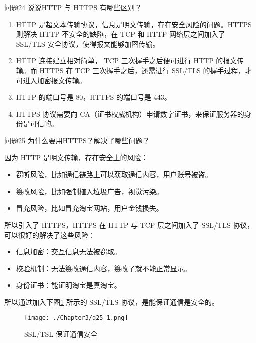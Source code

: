 \documentclass[cn,11pt,color=blue,lang=cn]{elegantbook}
\begin{document}
\begin{custom}{问题24}
说说HTTP 与 HTTPS 有哪些区别？
\end{custom}
\begin{solution}
\begin{enumerate}
	\item HTTP 是超⽂本传输协议，信息是明⽂传输，存在安全⻛险的问题。HTTPS 则解决 HTTP 不安全的缺陷，在 TCP 和 HTTP ⽹络层之间加⼊了 SSL/TLS 安全协议，使得报⽂能够加密传输。
	\item HTTP 连接建⽴相对简单， TCP 三次握⼿之后便可进⾏ HTTP 的报⽂传输。⽽ HTTPS 在 TCP 三次握⼿之后，还需进⾏ SSL/TLS 的握⼿过程，才可进⼊加密报⽂传输。
	\item HTTP 的端⼝号是 80，HTTPS 的端⼝号是 443。
	\item HTTPS 协议需要向 CA（证书权威机构）申请数字证书，来保证服务器的身份是可信的。
\end{enumerate}
\end{solution}

\begin{custom}{问题25}
为什么要用HTTPS？解决了哪些问题？
\end{custom}
\begin{solution}
因为 HTTP 是明⽂传输，存在安全上的风险：
\begin{itemize}
	\item 窃听⻛险，⽐如通信链路上可以获取通信内容，用户账号被盗。
	\item 篡改⻛险，⽐如强制植⼊垃圾⼴告，视觉污染。
	\item 冒充⻛险，⽐如冒充淘宝⽹站，用户金钱损失。
\end{itemize}

所以引入了 HTTPS，HTTPS 在 HTTP 与 TCP 层之间加⼊了 SSL/TLS 协议，可以很好的解决了这些风险：
\begin{itemize}
	\item 信息加密：交互信息⽆法被窃取。
	\item 校验机制：⽆法篡改通信内容，篡改了就不能正常显示。
	\item 身份证书：能证明淘宝是真淘宝。
\end{itemize}
所以通过加入下图\ref{fig25_1} 所示的 SSL/TLS 协议，是能保证通信是安全的。
\begin{figure}[htbp]
\centering
\texttt{[image: ./Chapter3/q25\_1.png]}
\caption{SSL/TSL 保证通信安全}
\label{fig25_1}
\end{figure}
\end{solution}
\end{document}
